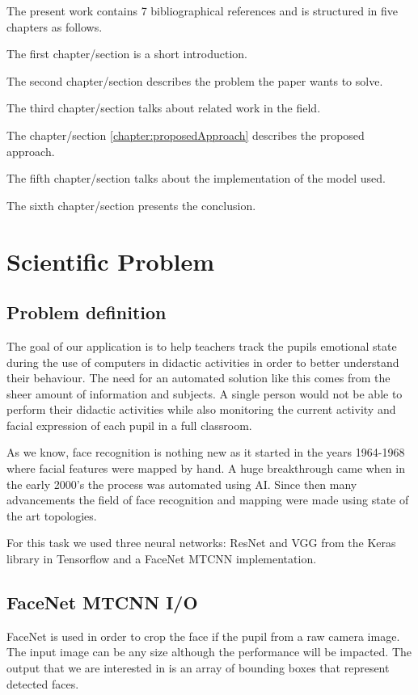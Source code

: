 \documentclass[runningheads,a4paper,11pt]{report}
\begin{document}
The present work contains 7 bibliographical references and is structured in five chapters as follows.

The first chapter/section is a short introduction.

The second chapter/section describes the problem the paper wants to solve.

The third chapter/section talks about related work in the field.

The chapter/section \ref{chapter:proposedApproach} describes the proposed approach.

The fifth chapter/section talks about the implementation of the model used.

The sixth chapter/section presents the conclusion.


\chapter{Scientific Problem}
\label{section:scientificProblem}


\section{Problem definition}
\label{section:problemDefinition}
The goal of our application is to help teachers track the pupils emotional state during the use of computers in didactic activities in order to better understand their behaviour. The need for an automated solution like this comes from the sheer amount of information and subjects. A single person would not be able to perform their didactic activities while also monitoring the current activity and facial expression of each pupil in a full classroom.

As we know, face recognition is nothing new as it started in the years 1964-1968 \cite{Bledsoe} where facial features were mapped by hand. A huge breakthrough came when in the early 2000's the process was automated using AI. Since then many advancements the field of face recognition and mapping were made using state of the art topologies.

For this task we used three neural networks:  ResNet \cite{HeZRS15} and VGG \cite{VGG} from the Keras \cite{Ker} library in Tensorflow \cite{Tf} and a FaceNet MTCNN \cite{SchroffKP15} implementation.

\section{FaceNet MTCNN I/O}
\label{section:faceNetMTCNNI/O}
FaceNet \cite{SchroffKP15} is used in order to crop the face if the pupil from a raw camera image.
The input image can be any size although the performance will be impacted. 
The output that we are interested in is an array of bounding boxes that represent detected faces.
\end{document}
